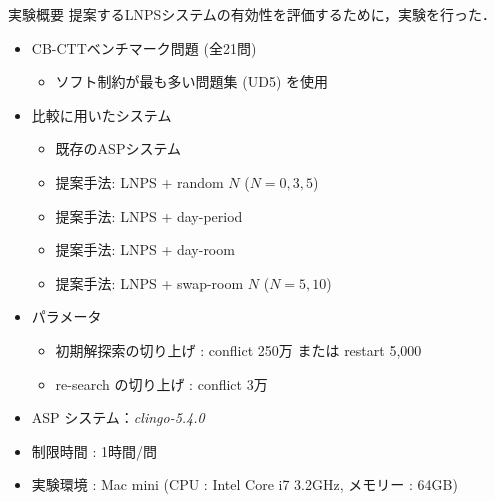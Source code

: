 \documentclass[11pt,dvipdfmx]{beamer}
\begin{document}
\begin{frame}{実験概要}
  提案するLNPSシステムの有効性を評価するために，実験を行った．
  \bigskip
  \begin{itemize}
  \item CB-CTTベンチマーク問題 (全21問)
    \begin{itemize}
    \item ソフト制約が最も多い問題集 (UD5) を使用
    \end{itemize}
  \item 比較に用いたシステム
    \begin{itemize}
    \item 既存のASPシステム{\clingo}
    \item 提案手法: LNPS + random $N$ ($N=0, 3, 5$)
    \item 提案手法: LNPS + day-period
    \item 提案手法: LNPS + day-room
    \item 提案手法: LNPS + swap-room $N$ ($N=5, 10$)
    \end{itemize}
   \item パラメータ
    \begin{itemize}
     \item 初期解探索の切り上げ : conflict 250万 または restart 5,000
     \item re-search の切り上げ : conflict 3万
    \end{itemize}
  \item ASP システム：\textit{clingo-5.4.0}
  \item 制限時間 : 1時間/問
  \item 実験環境 : Mac mini (CPU : Intel Core i7 3.2GHz, メモリー : 64GB) 
  \end{itemize}
\end{frame}
\end{document}
